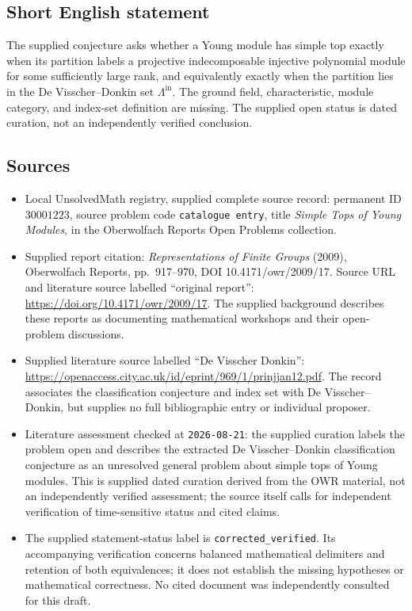 \documentclass[11pt]{article}
\begin{document}
\subsection{Short English statement}
The supplied conjecture asks whether a Young module has simple top exactly when its partition labels a projective indecomposable injective polynomial module for some sufficiently large rank, and equivalently exactly when the partition lies in the De Visscher--Donkin set \(\Lambda^{\mathrm{in}}\). The ground field, characteristic, module category, and index-set definition are missing. The supplied open status is dated curation, not an independently verified conclusion.
\subsection{Sources}
\begin{itemize}
\item Local UnsolvedMath registry, supplied complete source record: permanent ID \(30001223\), source problem code \texttt{catalogue entry}, title \emph{Simple Tops of Young Modules}, in the Oberwolfach Reports Open Problems collection.
\item Supplied report citation: \emph{Representations of Finite Groups} (2009), Oberwolfach Reports, pp.~917--970, DOI 10.4171/owr/2009/17. Source URL and literature source labelled ``original report'': \url{https://doi.org/10.4171/owr/2009/17}. The supplied background describes these reports as documenting mathematical workshops and their open-problem discussions.
\item Supplied literature source labelled ``De Visscher Donkin'': \url{https://openaccess.city.ac.uk/id/eprint/969/1/prinjjan12.pdf}. The record associates the classification conjecture and index set with De Visscher--Donkin, but supplies no full bibliographic entry or individual proposer.
\item Literature assessment checked at \texttt{2026-08-21}: the supplied curation labels the problem open and describes the extracted De Visscher--Donkin classification conjecture as an unresolved general problem about simple tops of Young modules. This is supplied dated curation derived from the OWR material, not an independently verified assessment; the source itself calls for independent verification of time-sensitive status and cited claims.
\item The supplied statement-status label is \texttt{corrected\_verified}. Its accompanying verification concerns balanced mathematical delimiters and retention of both equivalences; it does not establish the missing hypotheses or mathematical correctness. No cited document was independently consulted for this draft.
\end{itemize}
\end{document}
